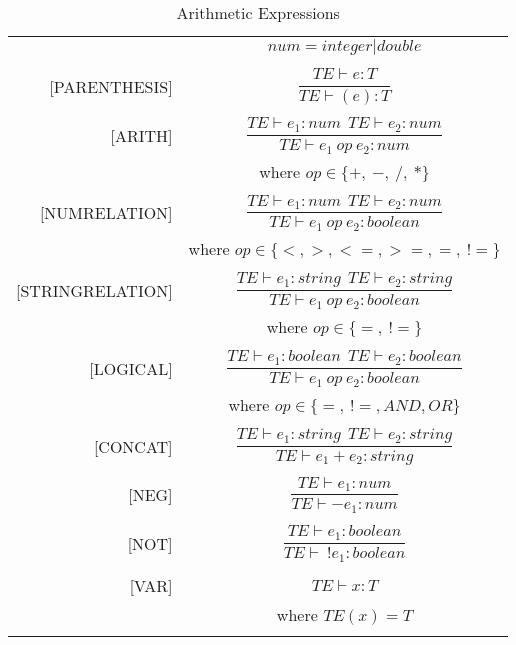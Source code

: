 \begin{longtable}[c] { r c }
  \centering

  & \(num = integer | double\) \\
  & \\

  [PARENTHESIS] & \(
    \dfrac{TE \vdash  e : T}{TE \vdash  (e) : T} \) \\
  & \\

  [ARITH] & \(
  \dfrac{TE \vdash e_{1} :  num \ \ TE \vdash e_{2} : num} 
    {TE \vdash e_{1} \ op \ e_{2} : num} \) \\
  & where \( op \in \{+, \ -, \ /, \ *\} \) \\
  & \\

  [NUMRELATION] & \(
  \dfrac{T E \vdash  e_1 : num \ \ TE \vdash  e_2 : num}
    {T E \vdash  e_1 \ op \ e_2 : boolean} \) \\
  & where \( op \in \{<, >, < =, >=, =, \ !=\} \) \\
  & \\

  [STRINGRELATION] & \(
  \dfrac{T E \vdash  e_1 : string \ \ TE \vdash  e_2 : string }
    {TE \vdash  e_1 \ op \ e_2 : boolean} \) \\
  & where \( op \in \{=, \ !=\} \) \\
  & \\

  [LOGICAL] & \(
  \dfrac{T E \vdash  e_1 : boolean \ \ TE \vdash  e_2 : boolean }
    {T E \vdash  e_1 \ op \ e_2 : boolean} \) \\
  & where \( op \in \{=, \ !=, AND, OR\} \) \\
  & \\

  [CONCAT] & \(
  \dfrac{TE \vdash  e_1 : string \ \ TE \vdash  e_2 : string }
    {TE \vdash  e_1 + e_2 : string} \) \\
  & \\

  [NEG] & \(
  \dfrac{TE \vdash  e_1 : num}
    {TE \vdash -e_1 : num} \) \\
  & \\

  [NOT] & \(
  \dfrac{TE \vdash  e_1 : boolean}
    {TE \vdash \ !e_1 : boolean} \) \\
  & \\

  [VAR] & \(
  {TE \vdash x : T}\) \\
  & where \(TE(x) = T\)\\

  \caption{Arithmetic Expressions}
\end{longtable}

